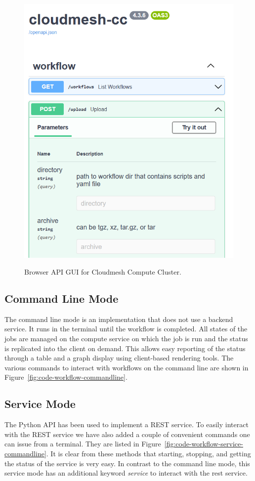 \documentclass[sigplan,screen]{acmart}
\begin{document}
\begin{figure}[htb]
{\centering
\includegraphics[width=0.52\columnwidth]{images/upload_api.png}
}
\caption{Browser API GUI for Cloudmesh Compute Cluster.}

\label{fig:openapi}

\end{figure}


\subsection{Command Line Mode}

The command line mode is an implementation that does not use a backend
service. It runs in the terminal until the workflow is completed. All
states of the jobs are managed on the compute service on which the job
is run and the status is replicated into the client on demand. This
allows easy reporting of the status through a table and a graph
display using client-based rendering tools. The various commands to
interact with workflows on the command line are shown in
Figure~\ref{fig:code-workflow-commandline}.


\subsection{Service Mode}

The Python API has been used to implement a REST service. To easily
interact with the REST service we have also added a couple of
convenient commands one can issue from a terminal. They are listed in
Figure~\ref{fig:code-workflow-service-commandline}. It is clear from
these methods that starting, stopping, and getting the status of the
service is very easy. In contrast to the command line mode, this
service mode has an additional keyword {\em service} to interact with
the rest service.
\end{document}
